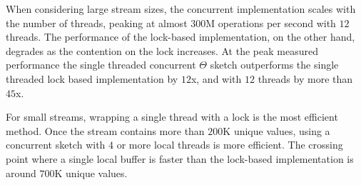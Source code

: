 When considering large stream sizes, the concurrent implementation scales with the number of threads, peaking at
almost $300$M operations per second with $12$ threads. The performance of the lock-based implementation, on the other hand,
degrades as the contention on the lock increases.
At the peak measured performance the single threaded concurrent $\Theta$ sketch outperforms the single
threaded lock based implementation by $12$x, and with $12$ threads by more than $45$x.

For small streams, wrapping a single thread with a lock is the most efficient method. Once the stream
contains more than $200$K unique values, using a concurrent sketch with $4$ or more local threads is more efficient.
The crossing point where a single local buffer is faster than the lock-based implementation is around $700$K unique values.
 
